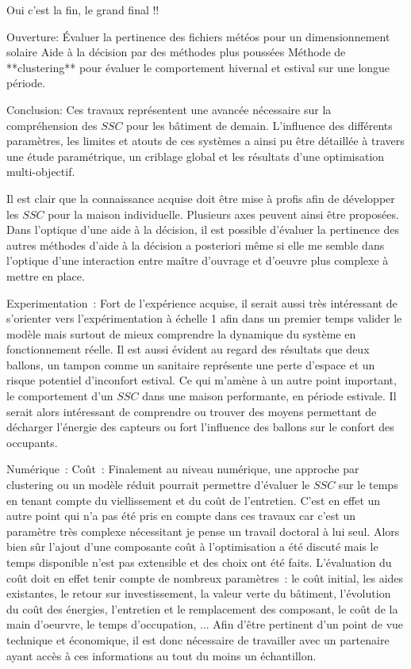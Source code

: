 


Oui c’est la fin, le grand final !!

Ouverture:
Évaluer la pertinence des fichiers météos pour un dimensionnement solaire
Aide à la décision par des méthodes plus poussées
Méthode de **clustering** pour évaluer le comportement hivernal et estival sur une
longue période.

Conclusion:
Ces travaux représentent une avancée nécessaire sur la compréhension des $SSC$ pour
les bâtiment de demain. L’influence des différents paramètres, les limites et atouts
de ces systèmes a ainsi pu être détaillée à travers une étude paramétrique, un criblage
global et les résultats d’une optimisation multi-objectif.

Il est clair que la connaissance acquise doit être mise à profis afin de développer
les $SSC$ pour la maison individuelle. Plusieurs axes peuvent ainsi être proposées.
Dans l’optique d’une aide à la décision, il est possible d’évaluer la pertinence
des autres méthodes d’aide à la décision a posteriori même si elle me semble dans
l’optique d’une interaction entre maître d’ouvrage et d’oeuvre plus complexe à mettre
en place.

Experimentation~:
Fort de l’expérience acquise, il serait aussi très intéressant de s’orienter vers
l’expérimentation à échelle 1 afin dans un premier temps valider le modèle mais surtout
de mieux comprendre la dynamique du système en fonctionnement réelle.
Il est aussi évident au regard des résultats que deux ballons, un tampon comme un sanitaire
représente une perte d’espace et un risque potentiel d’inconfort estival. Ce qui m’amène à
un autre point important, le comportement d’un $SSC$ dans une maison performante, en période
estivale. Il serait alors intéressant de comprendre ou trouver des moyens permettant de
décharger l’énergie des capteurs ou fort l’influence des ballons sur le confort des occupants.


Numérique~:
Coût~:
Finalement au niveau numérique, une approche par clustering ou un modèle réduit pourrait
permettre d’évaluer le $SSC$ sur le temps en tenant compte du viellissement et du coût
de l’entretien. C’est en effet un autre point qui n’a pas été pris en compte dans ces travaux
car c’est un paramètre très complexe nécessitant je pense un travail doctoral à lui seul.
Alors bien sûr l’ajout d’une composante coût à l’optimisation a été discuté mais le
temps disponible n’est pas extensible et des choix ont été faits.
L’évaluation du coût doit en effet tenir compte de nombreux paramètres~: le coût initial,
les aides existantes, le retour sur investissement, la valeur verte du bâtiment, l’évolution
du coût des énergies, l’entretien et le remplacement des composant, le coût de la main d’oeurvre,
le temps d’occupation, ...
Afin d’être pertinent d’un point de vue technique et économique, il est donc nécessaire
de travailler avec un partenaire ayant accès à ces informations au tout du moins un
échantillon.

